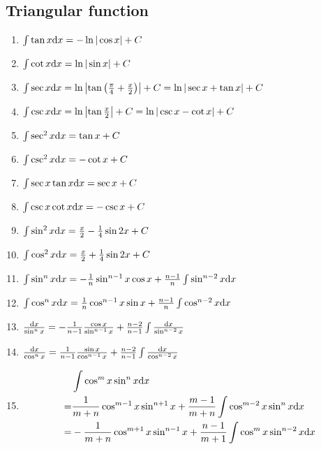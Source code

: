 	\subsection{Triangular function}

	\begin{enumerate}

	\item $ \int \tan x \mathrm{d} x = -\ln|\cos x| + C $

	\item $ \int \cot x \mathrm{d} x = \ln |\sin x| + C $

	\item $ \int \sec x \mathrm{d} x = \ln \left| \tan\left( \frac{\pi}{4} + \frac{x}{2} \right) \right| + C = \ln |\sec x + \tan x| + C $

	\item $ \int \csc x \mathrm{d} x = \ln \left| \tan\frac{x}{2} \right| + C = \ln |\csc x - \cot x| + C $

	\item $ \int \sec^2 x \mathrm{d} x = \tan x + C $

	\item $ \int \csc^2 x \mathrm{d} x = -\cot x + C $

	\item $ \int \sec x \tan x \mathrm{d} x = \sec x + C $

	\item $ \int \csc x \cot x \mathrm{d} x = -\csc x + C $

	\item $ \int \sin^2 x \mathrm{d} x = \frac{x}{2} - \frac{1}{4} \sin 2x + C $

	\item $ \int \cos^2 x \mathrm{d} x = \frac{x}{2} + \frac{1}{4} \sin 2x + C $

	\item $ \int \sin^n x \mathrm{d} x = -\frac{1}{n} \sin^{n-1} x \cos x + \frac{n-1}{n} \int \sin^{n-2} x \mathrm{d} x $

	\item $ \int \cos^n x \mathrm{d} x = \frac{1}{n} \cos^{n-1} x \sin x + \frac{n-1}{n} \int \cos^{n-2} x \mathrm{d} x $

	\item $ \frac{\mathrm{d} x}{\sin^n x} = -\frac{1}{n-1} \frac{\cos x}{\sin^{n-1}x} + \frac{n-2}{n-1} \int \frac{\mathrm{d} x}{\sin^{n-2}x} $

	\item $ \frac{\mathrm{d} x}{\cos^n x} = \frac{1}{n-1} \frac{\sin x}{\cos^{n-1}x} + \frac{n-2}{n-1} \int \frac{\mathrm{d} x}{\cos^{n-2}x} $

	\item \[ \begin{split} {} & \int \cos^m x \sin^n x \mathrm{d} x \\
		= & \frac{1}{m+n} \cos^{m-1} x \sin^{n+1}x + \frac{m-1}{m+n}\int\cos^{m-2}x\sin^nx\mathrm{d} x \\
		= & -\frac{1}{m+n} \cos^{m+1} x \sin^{n-1}x + \frac{n-1}{m+1} \int \cos^m x\sin^{n-2} x \mathrm{d} x \end{split} \]


\end{enumerate}
